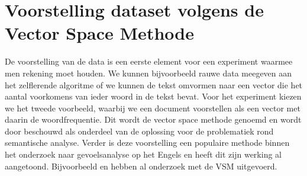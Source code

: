 \section{Voorstelling dataset volgens de Vector Space Methode}\label{Voorstelling dataset}
%
De voorstelling van de data is een eerste element voor een experiment waarmee men rekening moet houden. We kunnen bijvoorbeeld rauwe data meegeven aan het zelflerende algoritme of we kunnen de tekst omvormen naar een vector die het aantal voorkomens van ieder woord in de tekst bevat. Voor het experiment kiezen we het tweede voorbeeld, waarbij we een document voorstellen als een vector met daarin de woordfrequentie. Dit wordt de vector space methode genoemd en wordt door \cite{turney2010frequency} beschouwd als onderdeel van de oplossing voor de problematiek rond semantische analyse. Verder is deze voorstelling een populaire methode binnen het onderzoek naar gevoelsanalyse op het Engels en heeft dit zijn werking al aangetoond. Bijvoorbeeld \cite{pang2002thumbs} en \cite{maas2011learnin} hebben al onderzoek met de VSM uitgevoerd.

